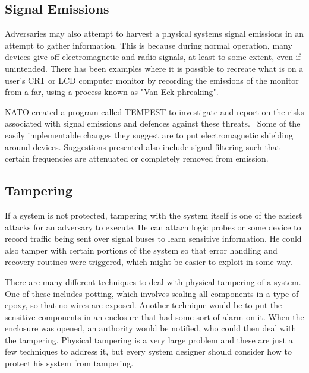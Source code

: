 \subsection{Signal Emissions}
Adversaries may also attempt to harvest a physical systems signal emissions in an attempt to gather information. This is because during
normal operation, many devices give off electromagnetic and radio signals, at least to some extent, even if unintended. There has been
examples where it is possible to recreate what is on a user's CRT or LCD computer monitor by recording the emissions of the monitor
from a far, using a process known as "Van Eck phreaking".~\cite{monitor}~\cite{lcds}

NATO created a program called TEMPEST to investigate and report on the risks associated with signal emissions and defences
against these threats.~\cite{tempest} Some of the easily implementable changes they suggest are to put electromagnetic shielding
around devices. Suggestions presented also include signal filtering such that certain frequencies are attenuated or completely removed
from emission.

\subsection{Tampering}
If a system is not protected, tampering with the system itself is one of the easiest attacks for an adversary to execute.
He can attach logic probes or some device to record traffic being sent over signal buses to learn sensitive information.
He could also tamper with certain portions of the system so that error handling and recovery routines were triggered,
which might be easier to exploit in some way.

There are many different techniques to deal with physical tampering of a system. One of these includes potting, which 
involves sealing all components in a type of epoxy, so that no wires are exposed. Another technique would be to
put the sensitive components in an enclosure that had some sort of alarm on it. When the enclosure was opened, an
authority would be notified, who could then deal with the tampering. Physical tampering is a very large problem
and these are just a few techniques to address it, but every system designer should consider how to protect his
system from tampering.
